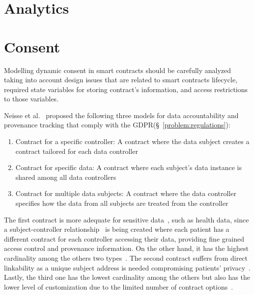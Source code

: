 \section{Analytics}
\label{future_work:analytics}

\section{Consent}
\label{future_work:consent}

Modelling dynamic consent in smart contracts should be carefully analyzed taking into account design issues that are related to smart contracts lifecycle, required state variables for storing contract’s information, and access restrictions to those variables.

Neisse et al.~\cite{DBLP:journals/corr/NeisseSF17} proposed the following three models for data accountability and provenance tracking that comply with the GDPR(§~\ref{problem:regulations}):

\begin{enumerate}
  \item Contract for a specific controller: A contract where the data subject creates a contract tailored for each data controller
  \item Contract for specific data: A contract where each subject’s data instance is shared among all data controllers
  \item Contract for multiple data subjects: A contract where the data controller specifies how the data from all subjects are treated from the controller
\end{enumerate}

The first contract is more adequate for sensitive data~\cite{DBLP:journals/corr/NeisseSF17}, such as health data, since a subject-controller relationship~\cite{Azaria2016} is being created where each patient has a different contract for each controller accessing their data, providing fine grained access control and provenance information. On the other hand, it has the highest cardinality among the others two types~\cite{DBLP:journals/corr/NeisseSF17}. The second contract suffers from direct linkability as a unique subject address is needed compromising patients’ privacy~\cite{DBLP:journals/corr/NeisseSF17}. Lastly, the third one has the lowest cardinality among the others but also has the lower level of customization due to the limited number of contract options~\cite{DBLP:journals/corr/NeisseSF17}.
